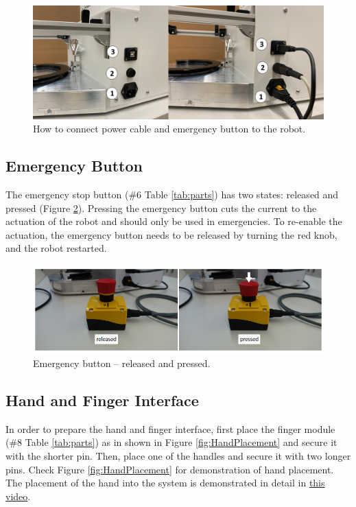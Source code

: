\documentclass[10pt,oneside,a4paper]{article}
\begin{document}
\begin{figure}[h!]
\begin{center}
\includegraphics[width=\columnwidth]{images/Hardware/CablesBoth.png}
\caption{How to connect power cable and emergency button to the robot.}
\label{fig:cables}
\end{center}
\end{figure}

\subsection{Emergency Button}
The emergency stop button (\#6 Table \ref{tab:parts}) has two states: released and pressed (Figure \ref{fig:EmergencyButton}). Pressing the emergency button cuts the current to the actuation of the robot and should only be used in emergencies. To re-enable the actuation, the emergency button needs to be released by turning the red knob, and the robot restarted. 

\begin{figure}[h!]
\begin{center}
\includegraphics[width=\columnwidth]{images/Hardware/EmergencyButton.png}
\caption{Emergency button – released and pressed.}
\label{fig:EmergencyButton}
\end{center}
\end{figure}

\subsection{Hand and Finger Interface}
In order to prepare the hand and finger interface, first place the finger module (\#8 Table \ref{tab:parts}) as in shown in Figure \ref{fig:HandPlacement} and secure it with the shorter pin. Then, place one of the handles and secure it with two longer pins. Check Figure \ref{fig:HandPlacement} for demonstration of hand placement. The placement of the hand into the system is demonstrated in detail in \href{https://www.youtube.com/watch?v=jmWdwJ00onU&t=1s&ab_channel=RELABETHZ}{this video}. 
\end{document}
